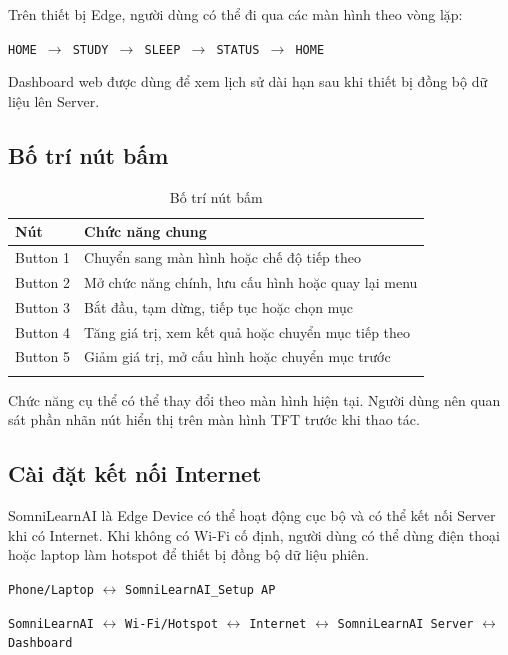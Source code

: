 \documentclass[12pt,a4paper]{article}
\begin{document}
Trên thiết bị Edge, người dùng có thể đi qua các màn hình theo vòng lặp:

\begin{center}
\texttt{HOME $\rightarrow$ STUDY $\rightarrow$ SLEEP $\rightarrow$ STATUS $\rightarrow$ HOME}
\end{center}

Dashboard web được dùng để xem lịch sử dài hạn sau khi thiết bị đồng bộ dữ liệu lên Server.

\subsection{Bố trí nút bấm}

\begin{longtable}{|P{3cm}|P{11.5cm}|}
\hline
\textbf{Nút} & \textbf{Chức năng chung} \\
\hline
Button 1 & Chuyển sang màn hình hoặc chế độ tiếp theo \\
\hline
Button 2 & Mở chức năng chính, lưu cấu hình hoặc quay lại menu \\
\hline
Button 3 & Bắt đầu, tạm dừng, tiếp tục hoặc chọn mục \\
\hline
Button 4 & Tăng giá trị, xem kết quả hoặc chuyển mục tiếp theo \\
\hline
Button 5 & Giảm giá trị, mở cấu hình hoặc chuyển mục trước \\
\hline
\caption{Bố trí nút bấm}
\end{longtable}

Chức năng cụ thể có thể thay đổi theo màn hình hiện tại. Người dùng nên quan sát phần nhãn nút hiển thị trên màn hình TFT trước khi thao tác.

\subsection{Cài đặt kết nối Internet}

SomniLearnAI là Edge Device có thể hoạt động cục bộ và có thể kết nối Server khi có Internet. Khi không có Wi-Fi cố định, người dùng có thể dùng điện thoại hoặc laptop làm hotspot để thiết bị đồng bộ dữ liệu phiên.

\begin{center}
\texttt{Phone/Laptop} $\leftrightarrow$ \texttt{SomniLearnAI\_Setup AP}

\texttt{SomniLearnAI} $\leftrightarrow$ \texttt{Wi-Fi/Hotspot} $\leftrightarrow$ \texttt{Internet} $\leftrightarrow$ \texttt{SomniLearnAI Server} $\leftrightarrow$ \texttt{Dashboard}
\end{center}
\end{document}
